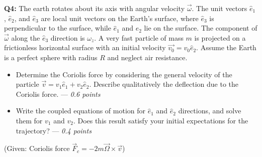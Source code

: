 \documentclass[a4paper,12pt]{article}
\begin{document}
\textbf{Q4:} The earth rotates about its axis with angular velocity $\vec{\omega}$. The unit vectors $\hat{e}_1$, $\hat{e}_2$, and $\hat{e}_3$ are local unit vectors on the Earth's surface, where $\hat{e}_3$ is perpendicular to the surface, while $\hat{e}_1$ and $\hat{e}_2$ lie on the surface. The component of $\vec{\omega}$ along the $\hat{e}_3$ direction is $\omega_z$. A very fast particle of mass $m$ is projected on a frictionless horizontal surface with an initial velocity $\vec{v_0}=v_0\hat{e}_2$. Assume the Earth is a perfect sphere with radius $R$ and neglect air resistance.

\begin{itemize}
    \item[\textbf{a.}] Determine the Coriolis force by considering the general velocity of the particle $\vec{v}=v_1\hat{e}_1+v_2\hat{e}_2$. Describe qualitatively the deflection due to the Coriolis force. --- \textit{0.6 points}
    \item[\textbf{b.}] Write the coupled equations of motion for $\hat{e}_1$ and $\hat{e}_2$ directions, and solve them for $v_1$ and $v_2$. Does this result satisfy your initial expectations for the trajectory? --- \textit{0.4 points}
\end{itemize}


(Given: Coriolis force $\vec{F}_c = -2m \vec{\Omega} \times \vec{v}$)
\end{document}
